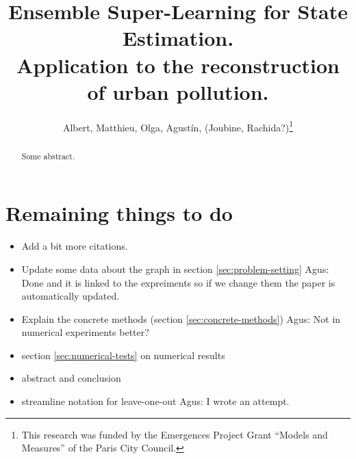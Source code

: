 \documentclass[11pt,a4paper,twoside]{article}
\theoremstyle{definition}
\numberwithin{equation}{section}
\newcommand{\<}{\langle}
\renewcommand{\>}{\rangle}
\newcommand{\ascomment}[1]{{\color{teal} Agus: #1}}
\begin{document}
\title{Ensemble Super-Learning for State Estimation. \\Application to the reconstruction of urban pollution.}
\author{Albert, Matthieu, Olga, Agustín, (Joubine, Rachida?)\thanks{This research was funded by the Emergences Project Grant ``Models and Measures'' of the Paris City Council.}
}
\date{}
\maketitle

\begin{abstract}
Some abstract.
\end{abstract}

\section*{Remaining things to do}
\begin{itemize}
\item Add a bit more citations.
\item Update some data about the graph in section \ref{sec:problem-setting}  \ascomment{Done and it is linked to the expreiments so if we change them the paper is automatically updated.}
\item Explain the concrete methods (section \ref{sec:concrete-methods}) \ascomment{Not in numerical experiments better?}
\item section \ref{sec:numerical-tests} on numerical results
\item abstract and conclusion
\item streamline notation for leave-one-out \ascomment{I wrote an attempt.}
\end{itemize}
\end{document}
